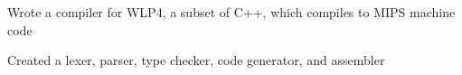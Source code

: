 \documentclass[]{deedy-resume-openfont}
\begin{document}
\begin{minipage}[t]{0.95\textwidth}

\begin{tightemize}
\item Wrote a compiler for WLP4, a subset of C++, which compiles to MIPS machine code
\item Created a lexer, parser, type checker, code generator, and assembler
\end{tightemize}





\end{minipage}
\end{document}
